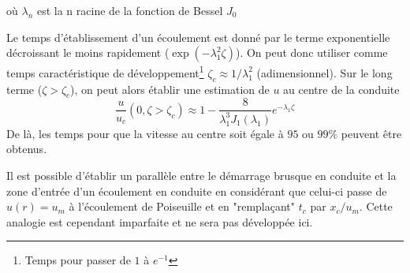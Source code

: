 \documentclass[a4paper,11pt]{report}
\begin{document}
      où $\lambda_n$ est la n racine de la fonction de Bessel $J_0$
      \begin{figure}[!h]
        \centering
        
      \end{figure}
      Le temps d'établissement d'un écoulement est donné par le terme exponentielle décroissant le moins rapidement ($\exp(-\lambda_1^2 \zeta)$). On peut donc utiliser comme temps caractéristique de développement\footnote{Temps pour passer de $1$ à $e^{-1}$} $\zeta_c \approx 1/\lambda^2_1$ (adimensionnel). Sur le long terme ($\zeta > \zeta_c$), on peut alors établir une estimation de $u$ au centre de la conduite
      \begin{equation}
        \frac{u}{u_c}(0, \zeta>\zeta_c) \approx 1 - \frac{8}{\lambda_1^3 J_1(\lambda_1)}e^{-\lambda_1\zeta}
      \end{equation}
      De là, les temps pour que la vitesse au centre soit égale à $95$ ou $99\%$ peuvent être obtenus.

      Il est possible d'établir un parallèle entre le démarrage brusque en conduite et la zone d'entrée d'un écoulement en conduite en considérant que celui-ci passe de $u(r)= u_m$ à l'écoulement de Poiseuille et en "remplaçant" $t_c$ par $x_c/u_m$. Cette analogie est cependant imparfaite et ne sera pas développée ici.
\end{document}
